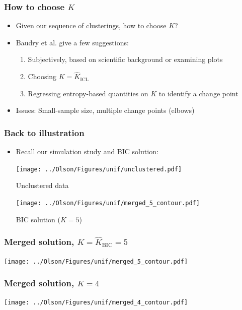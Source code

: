 \documentclass[mathserif,compress]{beamer}
\newcommand*\estim[1]{\widehat{#1}}
\renewcommand\;{\,}
\begin{document}
\begin{frame}\frametitle{How to choose $K$}
\begin{itemize}
\item[]
Given our sequence of clusterings, how to choose $K$?
\bigskip
\item[]
Baudry et al. give a few suggestions:
\begin{enumerate}
\bigskip
\item
Subjectively, based on scientific background or examining plots
\bigskip
\item
Choosing $K = \estim K_\text{ICL}$
\bigskip
\item
Regressing entropy-based quantities on $K$ to identify a change point
\end{enumerate}
\bigskip
\item[]
Issues: Small-sample size, multiple change points (elbows)
\end{itemize}
\end{frame}

\begin{frame}\frametitle{Back to illustration}
\begin{itemize}
\item[]
Recall our simulation study and BIC solution:
\begin{minipage}{0.45\linewidth}
\texttt{[image: ../Olson/Figures/unif/unclustered.pdf]}
\begin{center}
Unclustered data
\end{center}
\end{minipage}
\hfill
\begin{minipage}{0.45\linewidth}
\texttt{[image: ../Olson/Figures/unif/merged\_5\_contour.pdf]}
\begin{center}
BIC solution ($K = 5$)
\end{center}
\end{minipage}
\end{itemize}
\end{frame}

\begin{frame}\frametitle{Merged solution, $K = \estim K_\text{BIC} = 5$}
\begin{center}
\texttt{[image: ../Olson/Figures/unif/merged\_5\_contour.pdf]}
\end{center}
\end{frame}

\begin{frame}\frametitle{Merged solution, $K = 4$}
\begin{center}
\texttt{[image: ../Olson/Figures/unif/merged\_4\_contour.pdf]}
\end{center}
\end{frame}
\end{document}
